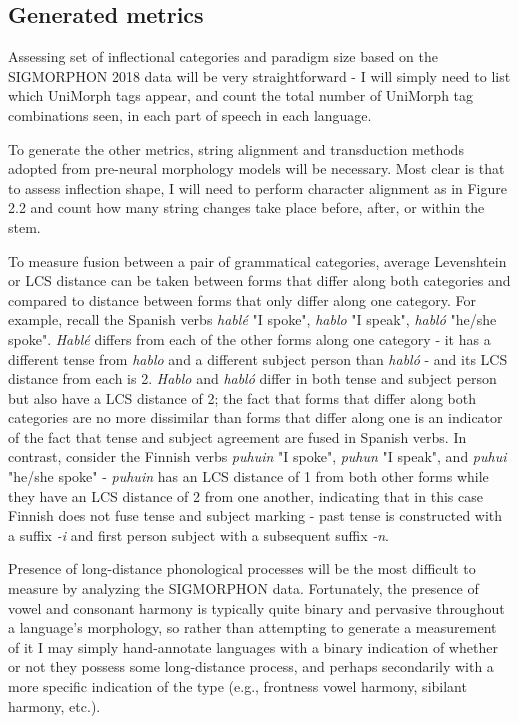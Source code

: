 \subsection{Generated metrics}

Assessing set of inflectional categories and paradigm size based on the SIGMORPHON 2018 data will be very straightforward - I will simply need to list which UniMorph tags appear, and count the total number of UniMorph tag combinations seen, in each part of speech in each language.

To generate the other metrics, string alignment and transduction methods adopted from pre-neural morphology models will be necessary. Most clear is that to assess inflection shape, I will need to perform character alignment as in Figure 2.2 and count how many string changes take place before, after, or within the stem. 

To measure fusion between a pair of grammatical categories, average Levenshtein or LCS distance can be taken between forms that differ along both categories and compared to distance between forms that only differ along one category. For example, recall the Spanish verbs \textit{hablé} "I spoke", \textit{hablo} "I speak", \textit{habló} "he/she spoke". \textit{Hablé} differs from each of the other forms along one category - it has a different tense from \textit{hablo} and a different subject person than \textit{habló} - and its LCS distance from each is 2. \textit{Hablo} and \textit{habló} differ in both tense and subject person but also have a LCS distance of 2; the fact that forms that differ along both categories are no more dissimilar than forms that differ along one is an indicator of the fact that tense and subject agreement are fused in Spanish verbs. In contrast, consider the Finnish verbs \textit{puhuin} "I spoke", \textit{puhun} "I speak", and \textit{puhui} "he/she spoke" - \textit{puhuin} has an LCS distance of 1 from both other forms while they have an LCS distance of 2 from one another, indicating that in this case Finnish does not fuse tense and subject marking - past tense is constructed with a suffix \textit{-i} and first person subject with a subsequent suffix \textit{-n}.

Presence of long-distance phonological processes will be the most difficult to measure by analyzing the SIGMORPHON data. Fortunately, the presence of vowel and consonant harmony is typically quite binary and pervasive throughout a language's morphology, so rather than attempting to generate a measurement of it I may simply hand-annotate languages with a binary indication of whether or not they possess some long-distance process, and perhaps secondarily with a more specific indication of the type (e.g., frontness vowel harmony, sibilant harmony, etc.).